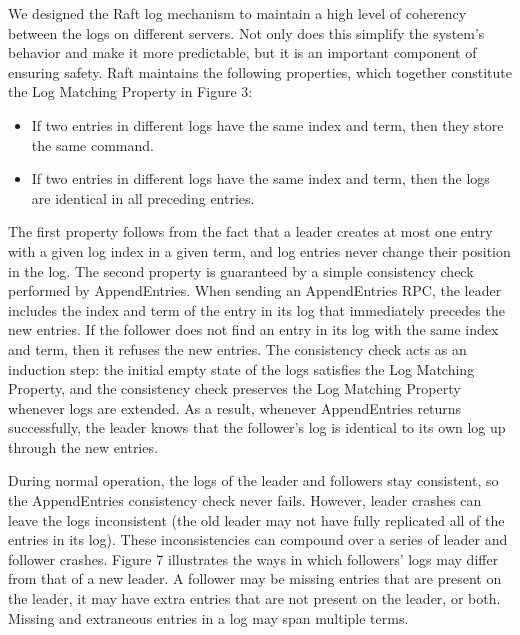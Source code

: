 \documentclass[
]{article}
\providecommand{\tightlist}{%
  \setlength{\itemsep}{0pt}\setlength{\parskip}{0pt}}
\begin{document}
We designed the Raft log mechanism to maintain a high level of coherency
between the logs on different servers. Not only does this simplify the
system's behavior and make it more predictable, but it is an important
component of ensuring safety. Raft maintains the following properties,
which together constitute the Log Matching Property in Figure 3:

\begin{itemize}
\tightlist
\item
  If two entries in different logs have the same index and term, then
  they store the same command.\\
\item
  If two entries in different logs have the same index and term, then
  the logs are identical in all preceding entries.
\end{itemize}

The first property follows from the fact that a leader creates at most
one entry with a given log index in a given term, and log entries never
change their position in the log. The second property is guaranteed by a
simple consistency check performed by AppendEntries. When sending an
AppendEntries RPC, the leader includes the index and term of the entry
in its log that immediately precedes the new entries. If the follower
does not find an entry in its log with the same index and term, then it
refuses the new entries. The consistency check acts as an induction
step: the initial empty state of the logs satisfies the Log Matching
Property, and the consistency check preserves the Log Matching Property
whenever logs are extended. As a result, whenever AppendEntries returns
successfully, the leader knows that the follower's log is identical to
its own log up through the new entries.

During normal operation, the logs of the leader and followers stay
consistent, so the AppendEntries consistency check never fails. However,
leader crashes can leave the logs inconsistent (the old leader may not
have fully replicated all of the entries in its log). These
inconsistencies can compound over a series of leader and follower
crashes. Figure 7 illustrates the ways in which followers' logs may
differ from that of a new leader. A follower may be missing entries that
are present on the leader, it may have extra entries that are not
present on the leader, or both. Missing and extraneous entries in a log
may span multiple terms.
\end{document}
